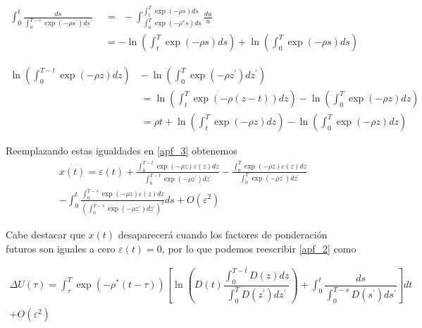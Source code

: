 \begin{equation*}
    \begin{split}
     \int_{0}^{t}\frac{d s}{\int_{0}^{T-s}\exp(-\rho s^{\prime})d s^{\prime}}~~&=~~ - \int^{\int_{t}^{T}\exp(-\rho s)ds}_{\int_{0}^{T}\exp(-\rho^{*} s)ds}\frac{d u}{u} \\ 
     &= -\ln\left(\int_{t}^{T}\exp(-\rho s)d s\right)+\ln\left(\int_{0}^{T}\exp(-\rho s)d s\right)
    \end{split}
\end{equation*}

\begin{equation*}
    \begin{split}
\ln\left(\int_{0}^{T-t}\exp(-\rho z)d z\right)~&-~\ln\left(\int_{0}^{T}\exp(-\rho z^{\prime})d z^{\prime}\right) \\
&= \ln\left(\int_{t}^{T}\exp(-\rho(z-t))d z\right)-\ln\left(\int_{0}^{T}\exp(-\rho z)d z\right) \\
&= \rho t+\ln\left(\int_{t}^{T}\exp(-\rho z)d z\right)-\ln\left(\int_{0}^{T}\exp(-\rho z)d z\right)
    \end{split}
\end{equation*}

Reemplazando estas igualdades en \ref{apf_3} obtenemos 
\begin{equation}
\label{apf_4}
    \begin{split}
        x(t)=\varepsilon(t)+{\frac{\int_{0}^{T-t}\exp(-\rho z)\varepsilon(z)d z}{\int_{0}^{T-t}\exp(-\rho z^{\prime})d z^{\prime}}}-{\frac{\int_{0}^{T}\exp(-\rho z)\varepsilon(z)d z}{\int_{0}^{T}\exp(-\rho z^{\prime})d z^{\prime}}} \\ 
       - \int_{0}^{t}{\frac{\int_{0}^{T-s}\exp(-\rho z)\varepsilon(z)d z}{\left(\int_{0}^{T-s}\exp(-\rho z^{\prime})d z^{\prime}\right)^2}}d s+O(\varepsilon^{2})
    \end{split}
\end{equation}

Cabe destacar que $x(t)$ desaparecerá cuando los factores de ponderación futuros son iguales a cero $\varepsilon(t)=0$, por lo que podemos reescribir \ref{apf_2} como

\begin{equation}
\label{apf_5}
    \begin{split}
        \Delta U(\tau) = \int_{\tau}^T \exp(-\rho^{*} (t- \tau)) \left[\ln \left(D(t) \dfrac{\int_0^{T-t}D(z)dz}{\int_0^T D(z^{\prime})dz^{\prime}} \right) + \int_0^t \dfrac{ds}{\int_0^{T-s}D(s^{\prime})ds^{\prime}} \right] dt \\ 
        + O(\varepsilon^2)
    \end{split}
\end{equation}

